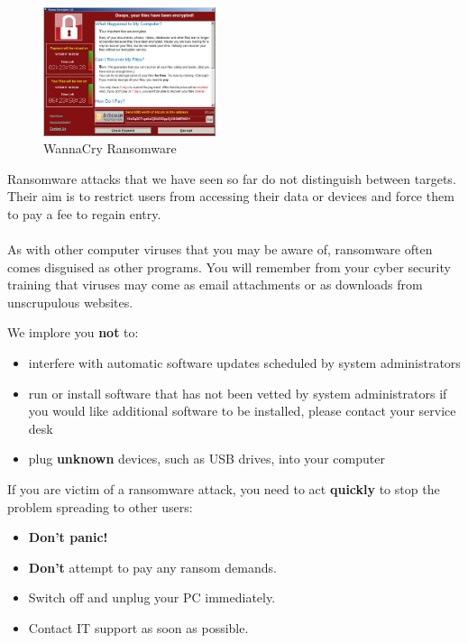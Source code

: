 \documentclass{article}
\begin{document}
\begin{figure}
\includegraphics[width=0.45\textwidth]{Figures/wannacry}
\caption{WannaCry Ransomware}
\label{wannacry_decryptor}
\end{figure}

Ransomware attacks that we have seen so far do not distinguish between targets. Their aim is to restrict users from accessing their data or devices and force them to pay a fee to regain entry.
\\\\
As with other computer viruses that you may be aware of, ransomware often comes disguised as other programs. You will remember from your cyber security training that viruses may come as email attachments or as downloads from unscrupulous websites.

We implore you \textbf{not} to:
\begin{itemize}
	\item interfere with automatic software updates scheduled by system administrators
	\item run or install software that has not been vetted by system administrators
		if you would like additional software to be installed, please contact your service desk
	\item plug \textbf{unknown} devices, such as USB drives, into your computer
\end{itemize}

If you are victim of a ransomware attack, you need to act \textbf{quickly} to stop the problem spreading to other users:
\begin{itemize}
	\item \textbf{Don't panic!}
	\item \textbf{Don't} attempt to pay any ransom demands.
	\item Switch off and unplug your PC immediately.
	\item Contact IT support as soon as possible.
\end{itemize}
\end{document}
